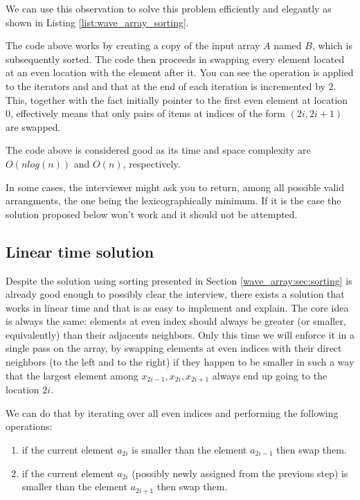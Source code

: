We can
use this observation to solve this problem efficiently and elegantly as shown in  Listing \ref{list:wave_array_sorting}.



The code above works by creating a copy of the input array $A$ named $B$, which is subsequently sorted. The code then proceeds in swapping every element located at an even location with the element after it. You can see the  operation is applied to the iterators  and  and that at the end of each iteration  is incremented by $2$. This, together with the fact  initially pointer to the first even element  at location $0$, effectively means that only pairs of items at indices of the form $(2i, 2i+1)$ are swapped.

The code above is considered good  as its time and space complexity are $O(nlog(n))$
and $O(n)$, respectively.

In some cases, the interviewer might ask you to return, among all possible valid arrangments, the one being the lexicographically minimum. If it is the case the solution proposed below won't
work and it should not be attempted.


\subsection{Linear time solution}

Despite the solution using sorting presented in Section \ref{wave_array:sec:sorting} is already good enough to
possibly clear the interview, there exists a solution that works in linear time and that is as easy to
implement and explain. The core idea is always the same: elements at even index should always be
greater (or smaller, equivalently) than their adjacents neighbors. Only this time we will enforce it in a single pass on the array, by
swapping elements at even indices with their direct neighbors (to the left and to the right) if they happen to be smaller in such a way that the largest element among  $x_{2i-1},x_{2i},x_{2i+1}$ always end up going to the location $2i$.

We can do that by iterating over all even indices and performing the following operations:
\begin{enumerate}
	\item if the current element $a_{2i}$ is smaller than the element $a_{2i-1}$ then swap them. 
	\item if the current element $a_{2i}$ (possibly newly assigned from the previous step) is smaller than the element $a_{2i+1}$ then swap them.
\end{enumerate}

